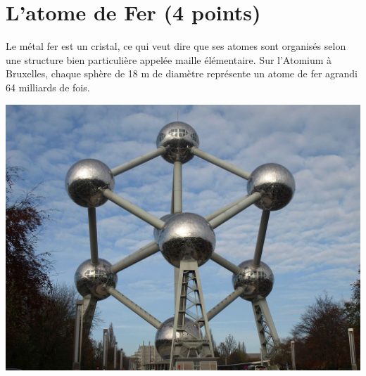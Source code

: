 \section{L'atome de Fer (4 points)}

\begin{multicols}{2}
	
	
	Le métal fer est un cristal, ce qui veut dire que ses atomes sont organisés selon une structure bien particulière appelée maille élémentaire. Sur l'Atomium à Bruxelles, chaque sphère de 18 m de diamètre représente un atome de fer agrandi 64 milliards de fois.
	
	\includegraphics[scale=0.5]{img/atomium}
\end{multicols}


